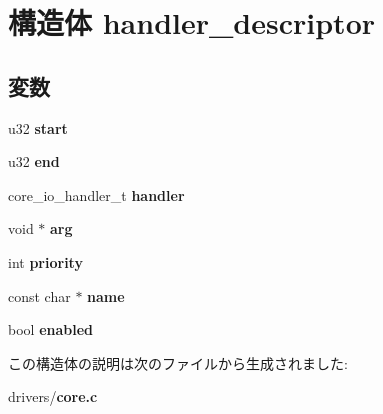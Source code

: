 \section{構造体 handler\-\_\-descriptor}
\label{structhandler__descriptor}
\subsection*{変数}
\begin{DoxyCompactItemize}
\item 
u32 {\bfseries start}\label{structhandler__descriptor_ac7a8660ed3c09868d81b59aa7b6b6257}

\item 
u32 {\bfseries end}\label{structhandler__descriptor_a57bc465572bff67775d9685856ffecd2}

\item 
core\-\_\-io\-\_\-handler\-\_\-t {\bfseries handler}\label{structhandler__descriptor_a4a5c08809144b9722ef3e6cd594d53d4}

\item 
void $\ast$ {\bfseries arg}\label{structhandler__descriptor_a7947460765d3a5f4a8443589757412ae}

\item 
int {\bfseries priority}\label{structhandler__descriptor_a6982eaff7320df6e530b103205ceafb5}

\item 
const char $\ast$ {\bfseries name}\label{structhandler__descriptor_a6a25d4f6106240fa220e770336a632b4}

\item 
bool {\bfseries enabled}\label{structhandler__descriptor_ab0388fbbbb9dc66d2b2a88e6f1d80404}

\end{DoxyCompactItemize}


この構造体の説明は次のファイルから生成されました\-:\begin{DoxyCompactItemize}
\item 
drivers/{\bf core.\-c}\end{DoxyCompactItemize}
